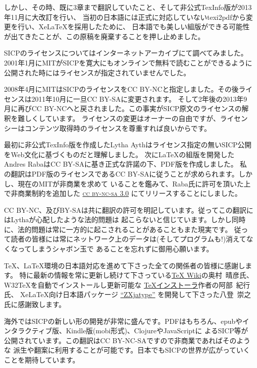 \documentclass[oneside]{book}
\newcommand{\acronym}[1]{\textsc{\MakeLowercase{#1}}}
\begin{document}
しかし、その時、既に3章まで翻訳していたこと、そして非公式TexInfo版が2013年11月に大改訂を行い、
当初の日本語には正式に対応していないtexi2pdfから変更を行い、XeLaTeXを採用したために、
日本語でも美しい組版ができる可能性が出てきたことが、この原稿を廃棄することを押し止めました。

SICPのライセンスについてはインターネットアーカイブにて調べてみました。
2001年1月にMITがSICPを寛大にもオンラインで無料で読むことができるように公開された時にはライセンスが指定されていませんでした。

2008年4月にMITはSICPのライセンスをCC BY-NCと指定しました。その後ライセンスは2011年10月に一旦CC BY-SAに変更されます。
そして2年後の2013年9月に再びCC BY-NCへと戻されました。この事実がSICP原文のライセンスの解釈を難しくしています。
ライセンスの変更はオーナーの自由ですが、ライセンシーはコンテンツ取得時のライセンスを尊重すれば良いからです。

最初に非公式TexInfo版を作成したLytha Aythはライセンス指定の無いSICP公開をWeb文化に基づくものだと理解しました。
次にLaTeXの組版を開発したAndres RabaはCC BY-SAに基き正式な許諾の下、PDF版を作成しました。
私の翻訳はPDF版のライセンスであるCC BY-SAに従うことが求められます。しかし、現在のMITが非商業を求めて
いることを鑑みて、Raba氏に許可を頂いた上で非商業制約を追加した
\href{http://creativecommons.org/licenses/by-nc-sa/3.0/}{\acronym{CC BY-NC-SA} 3.0}
にてリリースすることにしました。

CC BY-NC、及びBY-SAは共に翻訳の許可を明記しています。従ってこの翻訳にはLythaが心配したような法的問題は
起こらないと信じています。しかし同時に、法的問題は常に一方的に起こされることがあることもまた現実です。
従って読者の皆様には常にネットワーク上のデータは(そしてプログラムも!)消えてなくなってしまうシャボン玉で
あることを忘れずに御用心願います。

TeX、LaTeX環境の日本語対応を進めて下さった全ての関係者の皆様に感謝します。
特に最新の情報を常に更新し続けて下さっている\href{http://oku.edu.mie-u.ac.jp/~okumura/texwiki/}{TeX Wiki}の奥村~晴彦氏、
W32TeXを自動でインストールし更新可能な
\href{http://www.math.sci.hokudai.ac.jp/~abenori/soft/abtexinst.html}{TeXインストーラ}作者の阿部~紀行氏、
XeLaTeX向け日本語パッケージ
\href{http://zrbabbler.sp.land.to/zxjatype.html}{``ZXjatype''}
を開発して下さった八登~崇之氏に感謝致します。

海外ではSICPの新しい形の開発が非常に盛んです。PDFはもちろん、epubやインタラクティブ版、Kindle版(mobi形式)、ClojureやJavaScriptに
よるSICP等が公開されています。この翻訳はCC BY-NC-SAですので非商業であればそのような
派生や翻案に利用することが可能です。日本でもSICPの世界が広がっていくことを期待しています。
\end{document}
